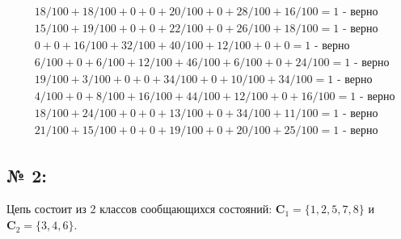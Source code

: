 \documentclass[12pt]{spbstu-task}
\begin{document}
\begin{align*}
  & 18/100 + 18/100 + 0 + 0 + 20/100 + 0 + 28/100 + 16/100 = 1 \text{ - верно} \\
  & 15/100 + 19/100 + 0 + 0 + 22/100 + 0 + 26/100 + 18/100 = 1 \text{ - верно} \\
  & 0 + 0 + 16/100 + 32/100 + 40/100 + 12/100 + 0 + 0 = 1 \text{ - верно} \\
  & 6/100 + 0 + 6/100 + 12/100 + 46/100 + 6/100 + 0 + 24/100 = 1 \text{ - верно} \\
  & 19/100 + 3/100 + 0 + 0 + 34/100 + 0 + 10/100 + 34/100 = 1 \text{ - верно} \\
  & 4/100 + 0 + 8/100 + 16/100 + 44/100 + 12/100 + 0 + 16/100 = 1 \text{ - верно} \\
  & 18/100 + 24/100 + 0 + 0 + 13/100 + 0 + 34/100 + 11/100 = 1 \text{ - верно} \\
  & 21/100 + 15/100 + 0 + 0 + 19/100 + 0 + 20/100 + 25/100 = 1 \text{ - верно}
\end{align*}
\subsection*{№ 2:}
Цепь состоит из 2 классов сообщающихся состояний:
\(\mathbf{C}_1 = \{1, 2, 5, 7, 8\}\) и \(\mathbf{C}_2 = \{3, 4, 6\}\).
\end{document}
